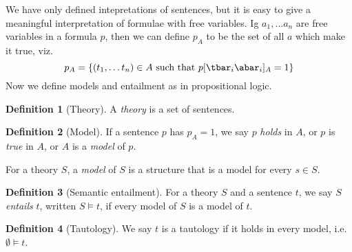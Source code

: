 \documentclass{article}
\theoremstyle{definition}
\newtheorem{definition}{Definition}
\numberwithin{definition}{section}
\newcommand{\entails}{\models}
\begin{document}
We have only defined intepretations of sentences, but it is easy to give a 
meaningful interpretation of formulae with free variables. 
Ig $a_{1},\ldots a_{n}$ are free variables in a formula $p$, 
then we can define $p_{A}$ to be the set of all $a$ which make it true, viz.
$$p_{A} = \{(t_1, \ldots t_n) \in A \text{ such that } p[\tbar_{i}\abar_{i}]_{A} = 1\}$$
Now we define models and entailment as in propositional logic. 

\begin{definition}[Theory]
A \textit{theory} is a set of sentences.
\end{definition}

\begin{definition}[Model]
  If a sentence $p$ has $p_{A}=1$, we say $p$ \textit{holds} in $A$, 
  or $p$ is \textit{true} in $A$, or $A$ is a \textit{model} of $p$. 
  
  For a theory $S$, a \textit{model} of $S$ is a structure that 
  is a model for every $s \in S$. 
\end{definition}

\begin{definition}[Semantic entailment]
  For a theory $S$ and a sentence $t$, we say $S$ \textit{entails} $t$, 
  written $S \entails t$, if every model of $S$ is a model of $t$. 
\end{definition}

\begin{definition}[Tautology]
  We say $t$ is a tautology if it holds in every model, i.e. $\emptyset \entails t$. 
\end{definition}
\end{document}

